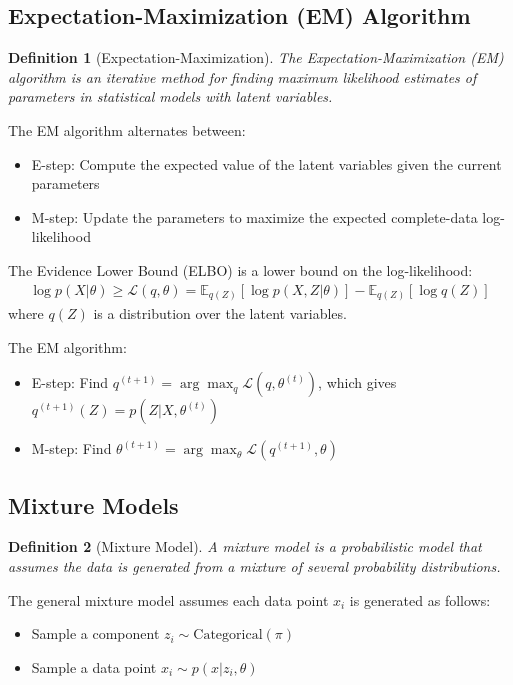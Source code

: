 \documentclass{article}
\newtheorem{definition}{Definition}
\begin{document}
\subsection{Expectation-Maximization (EM) Algorithm}
\begin{definition}[Expectation-Maximization]
The Expectation-Maximization (EM) algorithm is an iterative method for finding maximum likelihood estimates of parameters in statistical models with latent variables.
\end{definition}

The EM algorithm alternates between:
\begin{itemize}
\item E-step: Compute the expected value of the latent variables given the current parameters
\item M-step: Update the parameters to maximize the expected complete-data log-likelihood
\end{itemize}

The Evidence Lower Bound (ELBO) is a lower bound on the log-likelihood:
\begin{align}
\log p(X|\theta) \geq \mathcal{L}(q, \theta) = \mathbb{E}_{q(Z)}[\log p(X, Z|\theta)] - \mathbb{E}_{q(Z)}[\log q(Z)]
\end{align}
where $q(Z)$ is a distribution over the latent variables.

The EM algorithm:
\begin{itemize}
\item E-step: Find $q^{(t+1)} = \arg\max_q \mathcal{L}(q, \theta^{(t)})$, which gives $q^{(t+1)}(Z) = p(Z|X, \theta^{(t)})$
\item M-step: Find $\theta^{(t+1)} = \arg\max_\theta \mathcal{L}(q^{(t+1)}, \theta)$
\end{itemize}

\subsection{Mixture Models}
\begin{definition}[Mixture Model]
A mixture model is a probabilistic model that assumes the data is generated from a mixture of several probability distributions.
\end{definition}

The general mixture model assumes each data point $x_i$ is generated as follows:
\begin{itemize}
\item Sample a component $z_i \sim \text{Categorical}(\pi)$
\item Sample a data point $x_i \sim p(x|z_i, \theta)$
\end{itemize}
\end{document}
